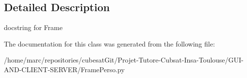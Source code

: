\subsection{Detailed Description}
\begin{DoxyVerb}docstring for Frame\end{DoxyVerb}
 

The documentation for this class was generated from the following file\+:\begin{DoxyCompactItemize}
\item 
/home/marc/repositories/cubesat\+Git/\+Projet-\/\+Tutore-\/\+Cubsat-\/\+Insa-\/\+Toulouse/\+G\+U\+I-\/\+A\+N\+D-\/\+C\+L\+I\+E\+N\+T-\/\+S\+E\+R\+V\+E\+R/Frame\+Perso.\+py\end{DoxyCompactItemize}
